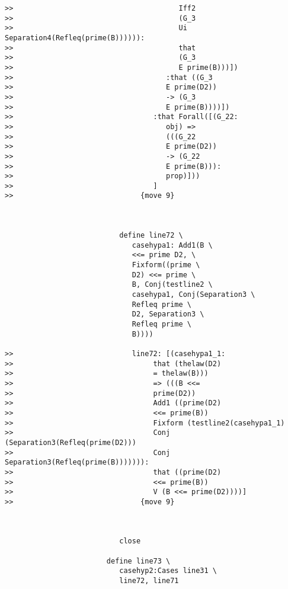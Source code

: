 \documentclass[12pt]{article}
\begin{document}
\begin{verbatim}
>>                                       Iff2
>>                                       (G_3
>>                                       Ui Separation4(Refleq(prime(B)))))):
>>                                       that
>>                                       (G_3
>>                                       E prime(B)))])
>>                                    :that ((G_3
>>                                    E prime(D2))
>>                                    -> (G_3
>>                                    E prime(B))))])
>>                                 :that Forall([(G_22:
>>                                    obj) =>
>>                                    (((G_22
>>                                    E prime(D2))
>>                                    -> (G_22
>>                                    E prime(B))):
>>                                    prop)]))
>>                                 ]
>>                              {move 9}



                           define line72 \
                              casehypa1: Add1(B \
                              <<= prime D2, \
                              Fixform((prime \
                              D2) <<= prime \
                              B, Conj(testline2 \
                              casehypa1, Conj(Separation3 \
                              Refleq prime \
                              D2, Separation3 \
                              Refleq prime \
                              B))))

>>                            line72: [(casehypa1_1:
>>                                 that (thelaw(D2)
>>                                 = thelaw(B)))
>>                                 => (((B <<=
>>                                 prime(D2))
>>                                 Add1 ((prime(D2)
>>                                 <<= prime(B))
>>                                 Fixform (testline2(casehypa1_1)
>>                                 Conj (Separation3(Refleq(prime(D2)))
>>                                 Conj Separation3(Refleq(prime(B))))))):
>>                                 that ((prime(D2)
>>                                 <<= prime(B))
>>                                 V (B <<= prime(D2))))]
>>                              {move 9}



                           close

                        define line73 \
                           casehyp2:Cases line31 \
                           line72, line71


\end{verbatim}
\end{document}
